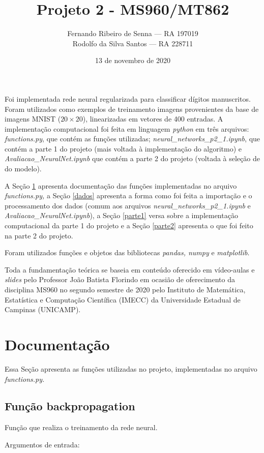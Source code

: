 \documentclass[12pt]{article}
\title{Projeto 2 - MS960/MT862}
\author{Fernando Ribeiro de Senna --- RA 197019\\
Rodolfo da Silva Santos --- RA 228711}
\date{13 de novembro de 2020}
\begin{document}
\maketitle

Foi implementada rede neural regularizada para classificar dígitos manuscritos. Foram utilizados como exemplos de treinamento imagens provenientes da base de imagens MNIST ($20 \times 20$), linearizadas em vetores de 400 entradas. A implementação computacional foi feita em linguagem \textit{python} em três arquivos: \textit{functions.py}, que contém as funções utilizadas; \textit{neural\_networks\_p2\_1.ipynb}, que contém a parte 1 do projeto (mais voltada à implementação do algoritmo) e \textit{Avaliacao\_NeuralNet.ipynb} que contém a parte 2 do projeto (voltada à seleção de do modelo).

A Seção \ref{doc} apresenta documentação das funções implementadas no arquivo \textit{functions.py,} a Seção \ref{dados} apresenta a forma como foi feita a importação e o processamento dos dados (comum aos arquivos \textit{neural\_networks\_p2\_1.ipynb} e \textit{Avaliacao\_NeuralNet.ipynb}), a Seção \ref{parte1} versa sobre a implementação computacional da parte 1 do projeto e a Seção \ref{parte2} apresenta o que foi feito na parte 2 do projeto.

Foram utilizados funções e objetos das bibliotecas \textit{pandas, numpy} e \textit{matplotlib}. 

Toda a fundamentação teórica se baseia em conteúdo oferecido em vídeo-aulas e \textit{slides} pelo Professor João Batista Florindo em ocasião de oferecimento da disciplina MS960 no segundo semestre de 2020 pelo Instituto de Matemática, Estatística e Computação Científica (IMECC) da Universidade Estadual de Campinas (UNICAMP).


\section{Documentação} \label{doc}
Essa Seção apresenta as funções utilizadas no projeto, implementadas no arquivo \textit{functions.py.}

\subsection{Função backpropagation}
Função que realiza o treinamento da rede neural.

Argumentos de entrada:
\end{document}
